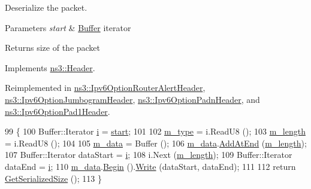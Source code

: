 Deserialize the packet. 


\begin{DoxyParams}{Parameters}
{\em start} & \hyperlink{classns3_1_1Buffer}{Buffer} iterator \\
\hline
\end{DoxyParams}
\begin{DoxyReturn}{Returns}
size of the packet 
\end{DoxyReturn}


Implements \hyperlink{classns3_1_1Header_a78be9400bb66b2a8543606f395ef5396}{ns3\+::\+Header}.



Reimplemented in \hyperlink{classns3_1_1Ipv6OptionRouterAlertHeader_a41262149c996341e578a7c4afa32ed61}{ns3\+::\+Ipv6\+Option\+Router\+Alert\+Header}, \hyperlink{classns3_1_1Ipv6OptionJumbogramHeader_abbd293011adcb442cf53eaf61aa401c6}{ns3\+::\+Ipv6\+Option\+Jumbogram\+Header}, \hyperlink{classns3_1_1Ipv6OptionPadnHeader_a11d0524b7407f22ab7dc2e618c7f810a}{ns3\+::\+Ipv6\+Option\+Padn\+Header}, and \hyperlink{classns3_1_1Ipv6OptionPad1Header_a88590ad835a1a40d88922dd21b42f0b3}{ns3\+::\+Ipv6\+Option\+Pad1\+Header}.


\begin{DoxyCode}
99 \{
100   Buffer::Iterator \hyperlink{bernuolliDistribution_8m_a6f6ccfcf58b31cb6412107d9d5281426}{i} = \hyperlink{namespacevisualizer_1_1core_a2a35e5d8a34af358b508dac8635754e0}{start};
101 
102   \hyperlink{classns3_1_1Ipv6OptionHeader_a189650d5494796ff239ae9fed8d86acf}{m\_type} = i.ReadU8 ();
103   \hyperlink{classns3_1_1Ipv6OptionHeader_a4a10839124d8b4ecba959636a3c85c27}{m\_length} = i.ReadU8 ();
104 
105   \hyperlink{classns3_1_1Ipv6OptionHeader_abe3238e11e16e0111f84027d91d1b3e5}{m\_data} = Buffer ();
106   \hyperlink{classns3_1_1Ipv6OptionHeader_abe3238e11e16e0111f84027d91d1b3e5}{m\_data}.\hyperlink{classns3_1_1Buffer_a92dd87809af24fb10696fee9a9cb56cf}{AddAtEnd} (\hyperlink{classns3_1_1Ipv6OptionHeader_a4a10839124d8b4ecba959636a3c85c27}{m\_length});
107   Buffer::Iterator dataStart = \hyperlink{bernuolliDistribution_8m_a6f6ccfcf58b31cb6412107d9d5281426}{i};
108   i.Next (\hyperlink{classns3_1_1Ipv6OptionHeader_a4a10839124d8b4ecba959636a3c85c27}{m\_length});
109   Buffer::Iterator dataEnd = \hyperlink{bernuolliDistribution_8m_a6f6ccfcf58b31cb6412107d9d5281426}{i};
110   \hyperlink{classns3_1_1Ipv6OptionHeader_abe3238e11e16e0111f84027d91d1b3e5}{m\_data}.\hyperlink{classns3_1_1Buffer_a893d4bf50df13e730b6cd0fda91b967f}{Begin} ().\hyperlink{classns3_1_1Buffer_1_1Iterator_a087b4e6b5d038544c750c741e8932d69}{Write} (dataStart, dataEnd);
111 
112   \textcolor{keywordflow}{return} \hyperlink{classns3_1_1Ipv6OptionHeader_a91f5ff1fa3f76db91b45a642d083ea10}{GetSerializedSize} ();
113 \}
\end{DoxyCode}


